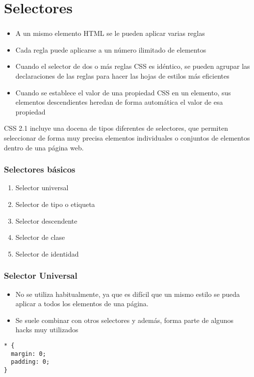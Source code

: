 \section{Selectores}

\begin{frame}
\frametitle{}

\begin{itemize}
  \item A un mismo elemento HTML se le pueden aplicar varias reglas 
  \item Cada regla puede aplicarse a un número ilimitado de elementos
  \item Cuando el selector de dos o más reglas CSS es idéntico, se pueden agrupar las declaraciones de las reglas para hacer las hojas de estilos más eficientes
  \item Cuando se establece el valor de una propiedad CSS en un elemento, sus elementos descendientes heredan de forma automática el valor de esa propiedad
\end{itemize}

CSS 2.1 incluye una docena de tipos diferentes de selectores, que permiten seleccionar de forma muy precisa elementos individuales o conjuntos de elementos dentro de una página web.

\end{frame}


\begin{frame}
\frametitle{Selectores básicos}

\begin{enumerate}
  \item Selector universal
  \item Selector de tipo o etiqueta
  \item Selector descendente
  \item Selector de clase
  \item Selector de identidad
\end{enumerate}

\end{frame}


\begin{frame}[fragile]
\frametitle{Selector Universal}

\begin{itemize}
  \item No se utiliza habitualmente, ya que es difícil que un mismo estilo se pueda aplicar a todos los elementos de una página.
  \item Se suele combinar con otros selectores y además, forma parte de algunos hacks muy utilizados
\end{itemize}

\begin{verbatim}
* {
  margin: 0;
  padding: 0;
}
\end{verbatim}

\end{frame}

